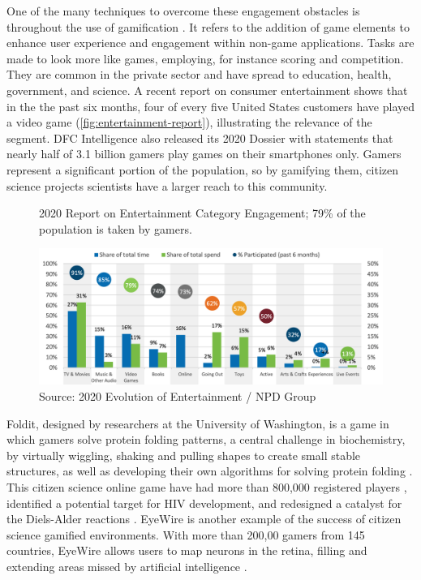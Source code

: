 One of the many techniques to overcome these engagement obstacles is throughout the use of gamification \cite{bowser2013using}. It refers to the addition of game elements to enhance user experience and engagement within non-game applications. Tasks are made to look more like games, employing, for instance scoring and competition. They are common in the private sector and have spread to education, health, government, and science. A recent report on consumer entertainment shows that in the the past six months, four of every five United States customers have played a video game (\autoref{fig:entertainment-report}), illustrating the relevance of the segment. DFC Intelligence also released its 2020 Dossier with statements that nearly half of 3.1 billion gamers play games on their smartphones only. Gamers represent a significant portion of the population, so by gamifying them, citizen science projects scientists have a larger reach to this community.

\begin{figure}[h]
    \centering
    \caption{2020 Report on Entertainment Category Engagement; 79\% of the population is taken by gamers.}
    \includegraphics[width=\linewidth]{images/game.png}
    \caption*{Source: 2020 Evolution of Entertainment / NPD Group}
    \label{fig:entertainment-report}
\end{figure}

Foldit, designed by researchers at the University of Washington, is a game in which gamers solve protein folding patterns, a central challenge in biochemistry, by virtually wiggling, shaking and pulling shapes to create small stable structures, as well as developing their own algorithms for solving protein folding \cite{bourzac2008enlisting}. This citizen science online game have had more than 800,000 registered players \cite{foldit2021players}, identified a potential target for HIV development, and redesigned a catalyst for the Diels-Alder reactions \cite{kreitmair2019citizen}. EyeWire is another example of the success of citizen science gamified environments. With more than 200,00 gamers from 145 countries, EyeWire allows users to map neurons in the retina, filling and extending areas missed by artificial intelligence \cite{kreitmair2019citizen}.

